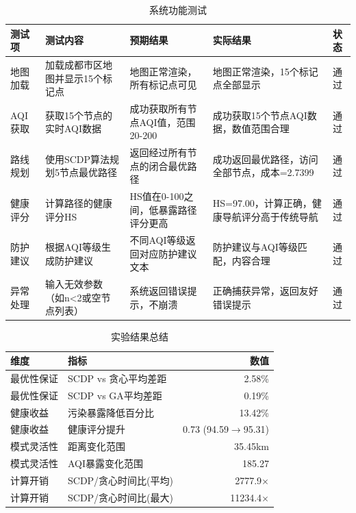 \begin{table}[htbp]
\centering
\caption{系统功能测试}
\label{tab:functional}
\begin{tabular}{lllll}
\hline
测试项 & 测试内容 & 预期结果 & 实际结果 & 状态 \\
\hline
地图加载 & 加载成都市区地图并显示15个标记点 & 地图正常渲染，所有标记点可见 & 地图正常渲染，15个标记点全部显示 & 通过 \\
AQI获取 & 获取15个节点的实时AQI数据 & 成功获取所有节点AQI值，范围20-200 & 成功获取15个节点AQI数据，数值范围合理 & 通过 \\
路线规划 & 使用SCDP算法规划5节点最优路径 & 返回经过所有节点的闭合最优路径 & 成功返回最优路径，访问全部节点，成本=2.7399 & 通过 \\
健康评分 & 计算路径的健康评分HS & HS值在0-100之间，低暴露路径评分更高 & HS=97.00，计算正确，健康导航评分高于传统导航 & 通过 \\
防护建议 & 根据AQI等级生成防护建议 & 不同AQI等级返回对应防护建议文本 & 防护建议与AQI等级匹配，内容合理 & 通过 \\
异常处理 & 输入无效参数（如n<2或空节点列表） & 系统返回错误提示，不崩溃 & 正确捕获异常，返回友好错误提示 & 通过 \\
\hline
\end{tabular}
\end{table}

\begin{table}[htbp]
\centering
\caption{实验结果总结}
\label{tab:summary}
\begin{tabular}{llr}
\hline
维度 & 指标 & 数值 \\
\hline
最优性保证 & SCDP vs 贪心平均差距 & 2.58\% \\
最优性保证 & SCDP vs GA平均差距 & 0.19\% \\
健康收益 & 污染暴露降低百分比 & 13.42\% \\
健康收益 & 健康评分提升 & 0.73 (94.59$\to$95.31) \\
模式灵活性 & 距离变化范围 & 35.45km \\
模式灵活性 & AQI暴露变化范围 & 185.27 \\
计算开销 & SCDP/贪心时间比(平均) & 2777.9$\times$ \\
计算开销 & SCDP/贪心时间比(最大) & 11234.4$\times$ \\
\hline
\end{tabular}
\end{table}